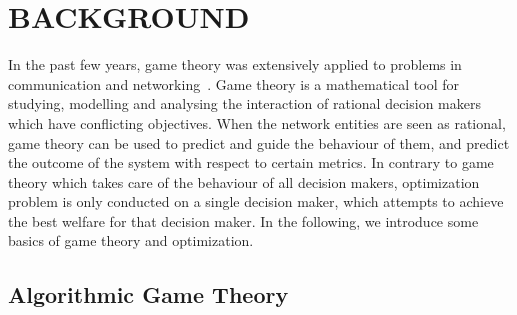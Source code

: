 \chapter{BACKGROUND}


In the past few years, game theory was extensively applied to problems in communication and networking~\cite{Neel06analysisand, Wang_gtc_crn_survey_2010}.
Game theory is a mathematical tool for studying, modelling and analysing the interaction of rational decision makers which have conflicting objectives.
When the network entities are seen as rational, game theory can be used to predict and guide the behaviour of them, and predict the outcome of the system with respect to certain metrics.
In contrary to game theory which takes care of the behaviour of all decision makers, optimization problem is only conducted on a single decision maker, which attempts to achieve the best welfare for that decision maker.
In the following, we introduce some basics of game theory and optimization.





\section{Algorithmic Game Theory}


